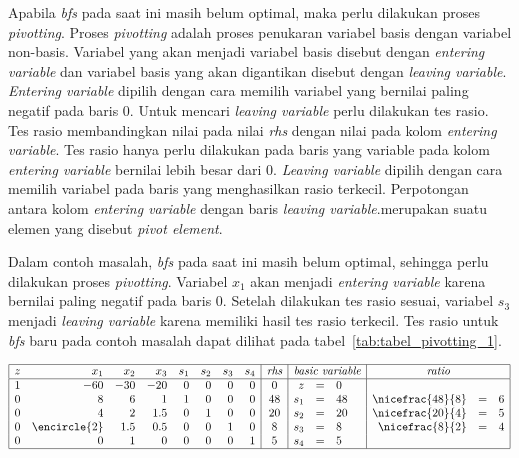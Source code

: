 Apabila \textit{bfs} pada saat ini masih belum optimal, maka perlu dilakukan proses \textit{pivotting}. Proses \textit{pivotting} adalah proses penukaran variabel basis dengan variabel non-basis. Variabel yang akan menjadi variabel basis disebut dengan \textit{entering variable} dan variabel basis yang akan digantikan disebut dengan \textit{leaving variable}. \textit{Entering variable} dipilih dengan cara memilih variabel yang bernilai paling negatif pada baris 0. Untuk mencari \textit{leaving variable} perlu dilakukan tes rasio. Tes rasio membandingkan nilai pada nilai \textit{rhs} dengan nilai pada kolom \textit{entering variable}. Tes rasio hanya perlu dilakukan pada baris yang variable pada kolom \textit{entering variable} bernilai lebih besar dari 0. \textit{Leaving variable} dipilih dengan cara memilih variabel pada baris yang menghasilkan rasio terkecil. Perpotongan antara kolom \textit{entering variable} dengan baris \textit{leaving variable}.merupakan suatu elemen yang disebut \textit{pivot element}.

Dalam contoh masalah, \textit{bfs} pada saat ini masih belum optimal, sehingga perlu dilakukan proses \textit{pivotting}. Variabel \(x_1\) akan menjadi \textit{entering variable} karena bernilai paling negatif pada baris 0. Setelah dilakukan tes rasio sesuai, variabel \(s_3\) menjadi \textit{leaving variable} karena memiliki hasil tes rasio terkecil. Tes rasio untuk \textit{bfs} baru pada contoh masalah dapat dilihat pada tabel~\ref{tab:tabel_pivotting_1}.

\begin{center}
	\label{tab:tabel_pivotting_1}
	$
	\begin{array}{|r r r r r r r r|c|r c l|r c l|}
		\hline
		z & x_1 & x_2 & x_3 & s_1 & s_2 & s_3 & s_4 & \textit{rhs} & \multicolumn{3}{c|}{\textit{basic variable}} & \multicolumn{3}{c|}{\textit{ratio}}\\
		\hline
		1 & -60 & -30 & -20 & 0 & 0 & 0 & 0 & 0 & z & = & 0 &&&\\
		0 & 8 & 6 & 1 & 1 & 0 & 0 & 0 & 48 & s_1 & = & 48 & \nicefrac{48}{8} & = & 6\\
		0 & 4 & 2 & 1.5 & 0 & 1 & 0 & 0 & 20 & s_2 & = & 20 & \nicefrac{20}{4} & = & 5\\
		0 & \encircle{2} & 1.5 & 0.5 & 0 & 0 & 1 & 0 & 8 & s_3 & = & 8 & \nicefrac{8}{2} & = & 4\\
		0 & 0 & 1 & 0 & 0 & 0 & 0 & 1 & 5 & s_4 & = & 5 &&&\\
		\hline
	\end{array}
	$
\end{center}

